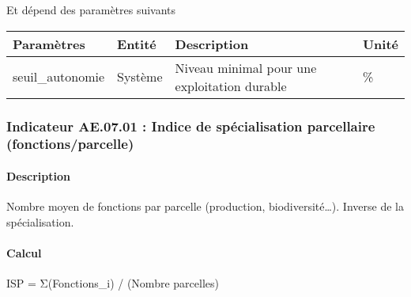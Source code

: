 \documentclass[
]{article}
\newenvironment{Shaded}{\begin{snugshade}}{\end{snugshade}}
\newcommand{\NormalTok}[1]{#1}
\begin{document}
Et dépend des paramètres suivants

\begin{longtable}[]{@{}
  >{\raggedright\arraybackslash}p{}
  >{\raggedright\arraybackslash}p{}
  >{\raggedright\arraybackslash}p{}
  >{\raggedright\arraybackslash}p{}@{}}
\toprule\noalign{}
\begin{minipage}[b]{\linewidth}\raggedright
\textbf{Paramètres}
\end{minipage} & \begin{minipage}[b]{\linewidth}\raggedright
\textbf{Entité}
\end{minipage} & \begin{minipage}[b]{\linewidth}\raggedright
\textbf{Description}
\end{minipage} & \begin{minipage}[b]{\linewidth}\raggedright
\textbf{Unité}
\end{minipage} \\
\midrule\noalign{}
\endhead
\bottomrule\noalign{}
\endlastfoot
seuil\_autonomie & Système & Niveau minimal pour une exploitation
durable & \% \\
\end{longtable}

\subsubsection{Indicateur AE.07.01 : Indice de spécialisation
parcellaire
(fonctions/parcelle)}\label{indicateur-ae.07.01-indice-de-spuxe9cialisation-parcellaire-fonctionsparcelle}

\paragraph{Description}\label{description-14}

Nombre moyen de fonctions par parcelle (production, biodiversité\ldots).
Inverse de la spécialisation.

\paragraph{Calcul}\label{calcul-14}

\begin{Shaded}
\begin{Highlighting}[]
\NormalTok{ISP = Σ(Fonctions\_i) / (Nombre parcelles)}
\end{Highlighting}
\end{Shaded}
\end{document}
